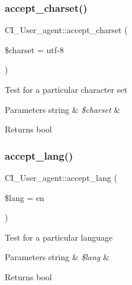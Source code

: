 \subsubsection{\texorpdfstring{accept\+\_\+charset()}{accept\_charset()}}
{\footnotesize\ttfamily C\+I\+\_\+\+User\+\_\+agent\+::accept\+\_\+charset (\begin{DoxyParamCaption}\item[{}]{\$charset = {\ttfamily \textquotesingle{}utf-\/8\textquotesingle{}} }\end{DoxyParamCaption})}

Test for a particular character set


\begin{DoxyParams}[1]{Parameters}
string & {\em \$charset} & \\
\hline
\end{DoxyParams}
\begin{DoxyReturn}{Returns}
bool 
\end{DoxyReturn}
\mbox{\label{class_c_i___user__agent_a1765c08f52cd43e31b80f894a3b6fe71}} 
\subsubsection{\texorpdfstring{accept\+\_\+lang()}{accept\_lang()}}
{\footnotesize\ttfamily C\+I\+\_\+\+User\+\_\+agent\+::accept\+\_\+lang (\begin{DoxyParamCaption}\item[{}]{\$lang = {\ttfamily \textquotesingle{}en\textquotesingle{}} }\end{DoxyParamCaption})}

Test for a particular language


\begin{DoxyParams}[1]{Parameters}
string & {\em \$lang} & \\
\hline
\end{DoxyParams}
\begin{DoxyReturn}{Returns}
bool 
\end{DoxyReturn}
\mbox{\label{class_c_i___user__agent_a71f3bb99b71e2297a5a281c4ea6d5eb0}} 
